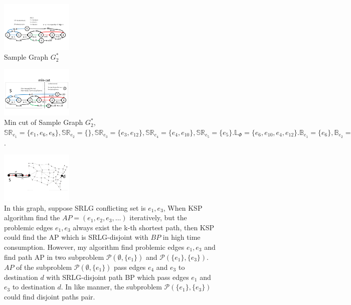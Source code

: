 \begin{figure}[tp]
\centering
\includegraphics[width=1.35in]{franz/SampleTwoInitGraphFlowGraph}
\caption{Sample Graph $G^*_2$}\label{fig:SampleTwoInitGraphFlowGraph}
\end{figure}
\begin{figure}[tp]
\centering
\includegraphics[width=1.35in]{franz/SampleTwoInitGraphCutGraph}
  \caption{Min cut of Sample Graph  $G^*_2$, $\mathbb{SR}_{e_1}=\{e_1,e_6,e_8\},\mathbb{SR}_{e_2}=\{\},\mathbb{SR}_{e_3}=\{e_3, e_{12}\},\mathbb{SR}_{e_4}=\{e_4, e_{10}\},\mathbb{SR}_{e_5}=\{e_5\}. \mathbb{L}_{\Phi}=\{e_{6},e_{10},e_{4},e_{12}\}. \mathbb{B}_{e_1}=\{e_6\},\mathbb{B}_{e_2}=\emptyset,\mathbb{B}_{e_3}=\{e_{12}\},\mathbb{B}_{e_4}=\{e_{10},e_4\}, \mathbb{B}_{e_5}=\emptyset$.}\label{fig:SampleTwoInitGraphCutGraph}
\end{figure}
\begin{figure}[tp]
\centering
\includegraphics[width=1.35in]{franz/KSPproblem}
  \caption{In this graph, suppose SRLG conflicting set is ${e_1,e_3}$, When KSP algorithm find the $AP=(e_1,e_2,e_3,\ldots)$ iteratively, but the problemic edges $e_1,e_3$ always exist the k-th shortest path, then KSP could find the AP which is SRLG-disjoint with $BP$ in high time consumption. However, my algorithm find  problemic edges $e_1,e_3$ and find path AP in two subproblem $\mathcal{P}(\emptyset,\{e_1\})$ and $\mathcal{P}(\{e_1\},\{e_3\})$. $AP$ of the subproblem $\mathcal{P}(\emptyset,\{e_1\})$ pass edges $e_4$ and $e_3$ to destination $d$ with SRLG-disjoint path BP which pass edges $e_1$ and $e_3$ to destination $d$. In like manner, the subproblem $\mathcal{P}(\{e_1\},\{e_3\})$ could find disjoint paths pair. }\label{fig:KSPproblem}
\end{figure}

